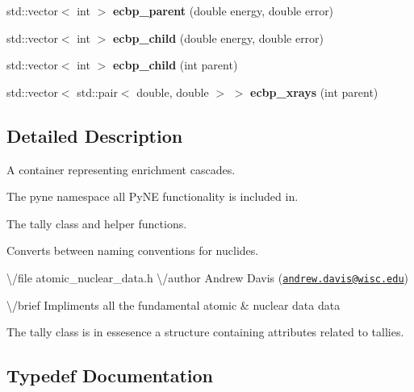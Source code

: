 \begin{DoxyCompactItemize}
\item 
std\+::vector$<$ int $>$ {\bfseries ecbp\+\_\+parent} (double energy, double error)\hypertarget{namespacepyne_a02be9a4983e3e83032e61aa37477b10f}{}\label{namespacepyne_a02be9a4983e3e83032e61aa37477b10f}

\item 
std\+::vector$<$ int $>$ {\bfseries ecbp\+\_\+child} (double energy, double error)\hypertarget{namespacepyne_ac59bf74785aa6b188506174de3b2ce53}{}\label{namespacepyne_ac59bf74785aa6b188506174de3b2ce53}

\item 
std\+::vector$<$ int $>$ {\bfseries ecbp\+\_\+child} (int parent)\hypertarget{namespacepyne_a2262ce3daa576a7bd988583ee2e9cbca}{}\label{namespacepyne_a2262ce3daa576a7bd988583ee2e9cbca}

\item 
std\+::vector$<$ std\+::pair$<$ double, double $>$ $>$ {\bfseries ecbp\+\_\+xrays} (int parent)\hypertarget{namespacepyne_a2534b5faa411582a7b6829c9bd54224d}{}\label{namespacepyne_a2534b5faa411582a7b6829c9bd54224d}

\end{DoxyCompactItemize}


\subsection{Detailed Description}
A container representing enrichment cascades. 

The \textquotesingle{}pyne\textquotesingle{} namespace all Py\+NE functionality is included in.

The tally class and helper functions.

Converts between naming conventions for nuclides.

\textbackslash{}/file atomic\+\_\+nuclear\+\_\+data.\+h \textbackslash{}/author Andrew Davis (\href{mailto:andrew.davis@wisc.edu}{\tt andrew.\+davis@wisc.\+edu})

\textbackslash{}/brief Impliments all the fundamental atomic \& nuclear data data

The tally class is in essesence a structure containing attributes related to tallies. 

\subsection{Typedef Documentation}
